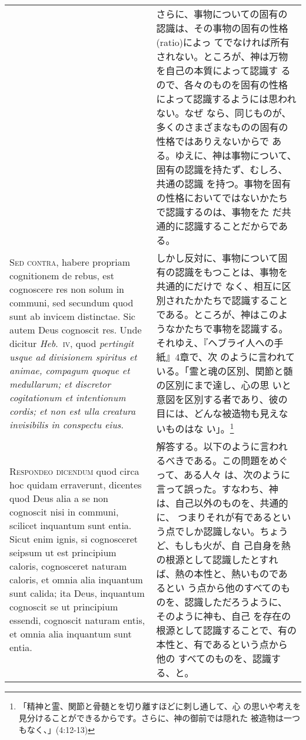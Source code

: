 \documentclass[10pt]{jsarticle} %
\begin{document}
\begin{longtable}{p{21em}p{21em}}
&

さらに、事物についての固有の認識は、その事物の固有の性格(ratio)によっ
てでなければ所有されない。ところが、神は万物を自己の本質によって認識す
るので、各々のものを固有の性格によって認識するようには思われない。なぜ
なら、同じものが、多くのさまざまなものの固有の性格ではありえないからで
ある。ゆえに、神は事物について、固有の認識を持たず、むしろ、共通の認識
を持つ。事物を固有の性格においてではないかたちで認識するのは、事物をた
だ共通的に認識することだからである。

\\


{\scshape Sed contra}, habere propriam cognitionem de rebus, est
cognoscere res non solum in communi, sed secundum quod sunt ab invicem
distinctae. Sic autem Deus cognoscit res. Unde dicitur {\itshape
Heb}.~{\scshape iv}, quod {\itshape pertingit usque ad divisionem
spiritus et animae, compagum quoque et medullarum; et discretor
cogitationum et intentionum cordis; et non est ulla creatura invisibilis
in conspectu eius}.


&

しかし反対に、事物について固有の認識をもつことは、事物を共通的にだけで
なく、相互に区別されたかたちで認識することである。ところが、神はこのよ
うなかたちで事物を認識する。それゆえ、『ヘブライ人への手紙』4章で、次
のように言われている。「霊と魂の区別、関節と髄の区別にまで達し、心の思
いと意図を区別する者であり、彼の目には、どんな被造物も見えないものはな
い」。\footnote{「精神と霊、関節と骨髄とを切り離すほどに刺し通して、心
の思いや考えを見分けることができるからです。さらに、神の御前では隠れた
被造物は一つもなく、」(4:12-13)}


\\


{\scshape Respondeo dicendum} quod circa hoc quidam
erraverunt, dicentes quod Deus alia a se non cognoscit nisi in communi,
scilicet inquantum sunt entia. Sicut enim ignis, si cognosceret seipsum
ut est principium caloris, cognosceret naturam caloris, et omnia alia
inquantum sunt calida; ita Deus, inquantum cognoscit se ut principium
essendi, cognoscit naturam entis, et omnia alia inquantum sunt
entia. 

&

解答する。以下のように言われるべきである。この問題をめぐって、ある人々
は、次のように言って誤った。すなわち、神は、自己以外のものを、共通的に、
つまりそれが有であるという点でしか認識しない。ちょうど、もしも火が、自
己自身を熱の根源として認識したとすれば、熱の本性と、熱いものであるとい
う点から他のすべてのものを、認識しただろうように、そのように神も、自己
を存在の根源として認識することで、有の本性と、有であるという点から他の
すべてのものを、認識する、と。


\end{longtable}
\end{document}
